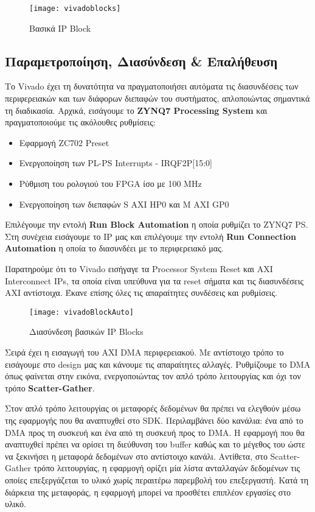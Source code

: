 \begin{figure}[H]
   \centering
   \texttt{[image: vivadoblocks]}\\
   \caption{Βασικά IP Block}
\end{figure}

\subsection{Παραμετροποίηση, Διασύνδεση \& Επαλήθευση}

Το Vivado έχει τη δυνατότητα να πραγματοποιήσει αυτόματα τις διασυνδέσεις των περιφερειακών και των διάφορων διεπαφών του συστήματος, απλοποιώντας σημαντικά τη διαδικασία. Αρχικά, εισάγουμε το \textbf{ZYNQ7 Processing System} και πραγματοποιούμε τις ακόλουθες ρυθμίσεις:
\begin{itemize}
	\item{Εφαρμογή ZC702 Preset}
	\item{Ενεργοποίηση των PL-PS Interrupts - IRQ\textunderscore F2P[15:0]}
	\item{Ρύθμιση του ρολογιού του FPGA ίσο με 100 MHz}
	\item{Ενεργοποίηση των διεπαφών S AXI HP0 και M AXI GP0}\\
\end{itemize}

Επιλέγουμε την εντολή \textbf{Run Block Automation} η οποία ρυθμίζει το ZYNQ7 PS. Στη συνέχεια εισάγουμε το IP μας και επιλέγουμε την εντολή \textbf{Run Connection Automation} η οποία το διασυνδέει με το περιφερειακό μας.

Παρατηρούμε ότι το Vivado εισήγαγε τα Processor System Reset και AXI Interconnect IPs, τα οποία είναι υπεύθυνα για τα reset σήματα και τις διασυνδέσεις AXI αντίστοιχα. Έκανε επίσης όλες τις απαραίτητες συνδέσεις και ρυθμίσεις.
\begin{figure}[H]
   \centering
   \texttt{[image: vivadoBlockAuto]}\\
   \caption{Διασύνδεση βασικών IP Blocks}
\end{figure}

Σειρά έχει η εισαγωγή του AXI DMA περιφερειακού. Με αντίστοιχο τρόπο το εισάγουμε στο design μας και κάνουμε τις απαραίτητες αλλαγές. Ρυθμίζουμε το DMA όπως φαίνεται στην εικόνα, ενεργοποιώντας τον απλό τρόπο λειτουργίας και όχι τον τρόπο \textbf{Scatter-Gather}.

Στον απλό τρόπο λειτουργίας οι μεταφορές δεδομένων θα πρέπει να ελεγθούν μέσω της εφαρμογής που θα αναπτυχθεί στο SDK. Περιλαμβάνει δύο κανάλια: ένα από το DMA προς τη συσκευή και ένα από τη συσκευή προς το DMA. Η εφαρμογή που θα αναπτυχθεί πρέπει να ορίσει τη διεύθυνση του buffer καθώς και το μέγεθος του ώστε να ξεκινήσει η μεταφορά δεδομένων στο αντίστοιχο κανάλι. Αντίθετα, στο Scatter-Gather τρόπο λειτουργίας, η εφαρμογή ορίζει μία λίστα ανταλλαγών δεδομένων τις οποίες επεξεργάζεται το υλικό χωρίς περαιτέρω παρεμβολή του επεξεργαστή. Κατά τη διάρκεια της μεταφοράς, η εφαρμογή μπορεί να προσθέτει επιπλέον εργασίες στο υλικό.

